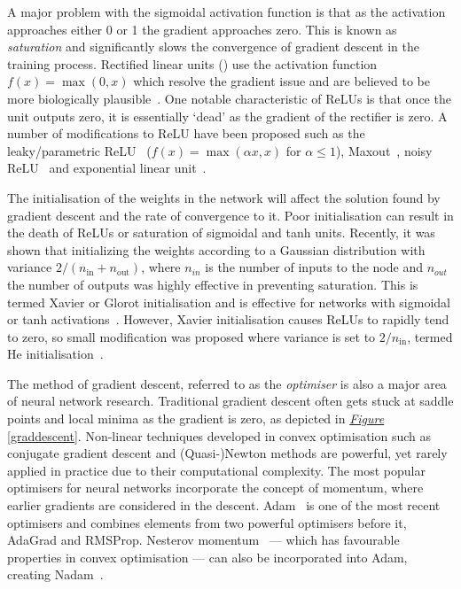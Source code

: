 \documentclass[12pt, twoside]{book}
\renewcommand\emph[1]{\textit{\color{USred}{#1}}}
\begin{document}
A major problem with the sigmoidal activation function is that as the activation approaches either 0 or 1 the gradient approaches zero. This is known as \textit{saturation} and significantly slows the convergence of gradient descent in the training process. Rectified linear units (\emph{ReLUs}) use the activation function $f(x) = \max(0,x)$ which resolve the gradient issue and are believed to be more biologically plausible~\cite{relu,relubiology}. One notable characteristic of ReLUs is that once the unit outputs zero, it is essentially `dead' as the gradient of the rectifier is zero. A number of modifications to ReLU have been proposed such as the leaky/parametric ReLU~\cite{heinitialization} ($f(x) = \max(\alpha x, x)$ for $\alpha\leq 1$), Maxout~\cite{goodfellow2013maxout}, noisy ReLU~\cite{relu} and exponential linear unit~\cite{clevert2015fast}.

The initialisation of the weights in the network will affect the solution found by gradient descent and the rate of convergence to it. Poor initialisation can result in the death of ReLUs or saturation of sigmoidal and tanh units. Recently, it was shown that initializing the weights according to a Gaussian distribution with variance $2/(n_{\text{in}}+n_{\text{out}})$, where $n_{in}$ is the number of inputs to the node and $n_{out}$ the number of outputs was highly effective in preventing saturation. This is termed Xavier or Glorot initialisation and is effective for networks with sigmoidal or tanh activations~\cite{glorot2010understanding}. However, Xavier initialisation causes ReLUs to rapidly tend to zero, so small modification was proposed where variance is set to $2/n_{\text{in}}$, termed He initialisation~\cite{heinitialization}.

The method of gradient descent, referred to as the \textit{optimiser} is also a major area of neural network research. Traditional gradient descent often gets stuck at saddle points and local minima as the gradient is zero, as depicted in \textit{\hyperref[graddescent]{Figure}} \ref{graddescent}. Non-linear techniques developed in convex optimisation such as conjugate gradient descent and (Quasi-)Newton methods are powerful, yet rarely applied in practice due to their computational complexity. The most popular optimisers for neural networks incorporate the concept of momentum, where earlier gradients are considered in the descent. Adam~\cite{adam} is one of the most recent optimisers and combines elements from two powerful optimisers before it, AdaGrad and RMSProp. Nesterov momentum~\cite{nesterov1983method} --- which has favourable properties in convex optimisation --- can also be incorporated into Adam, creating Nadam~\cite{nadam}. 
\end{document}
